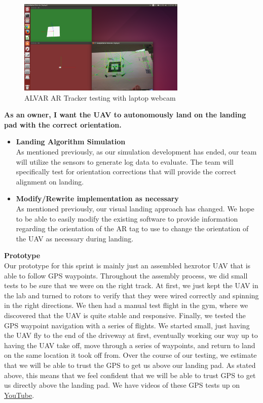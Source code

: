 \begin{itemize}
\begin{figure}[h]
\includegraphics[width=8cm]{AlvarExample.png}
\centering
\caption{ALVAR AR Tracker testing with laptop webcam}
\label{fig:artracker}
\end{figure}

\end{itemize}


\vspace{3mm}
\noindent \large{\textbf{As an owner, I want the UAV to autonomously land on the landing pad with the correct orientation.}}
\normalsize
\begin{itemize}
\item \textbf{Landing Algorithm Simulation}\\
As mentioned previously, as our simulation development has ended, our team will utilize the sensors to generate log data to evaluate. The team will specifically test for orientation corrections that will provide the correct alignment on landing.
\item \textbf{Modify/Rewrite implementation as necessary}\\
As mentioned previously, our visual landing approach has changed. We hope to be able to easily modify the existing software to provide information regarding the orientation of the AR tag to use to change the orientation of the UAV as necessary during landing.
\end{itemize}

\vspace{6mm}
\noindent\Large{\textbf{Prototype}}\\
\normalsize
Our prototype for this sprint is mainly just an assembled hexrotor UAV that is able to follow GPS waypoints. Throughout the assembly process, we did small tests to be sure that we were on the right track. At first, we just kept the UAV in the lab and turned to rotors to verify that they were wired correctly and spinning in the right directions. We then had a manual test flight in the gym, where we discovered that the UAV is quite stable and responsive. Finally, we tested the GPS waypoint navigation with a series of flights. We started small, just having the UAV fly to the end of the driveway at first, eventually working our way up to having the UAV take off, move through a series of waypoints, and return to land on the same location it took off from. Over the course of our testing, we estimate that we will be able to trust the GPS to get us above our landing pad. As stated above, this means that we feel confident that we will be able to trust GPS to get us directly above the landing pad. \newline\newline
We have videos of these GPS tests up on \href{https://www.youtube.com/channel/UCfcuqDXKMLgbUWu3rt9rITA}{YouTube}.

